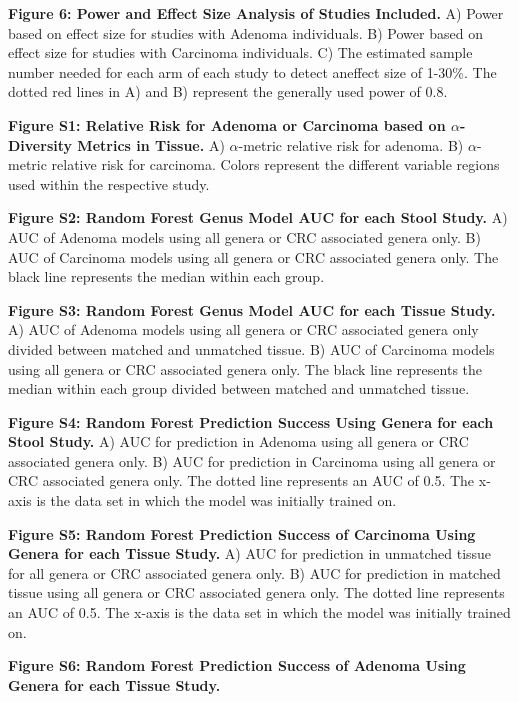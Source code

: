 \documentclass[12pt,]{article}
\begin{document}
\textbf{Figure 6: Power and Effect Size Analysis of Studies Included.}
A) Power based on effect size for studies with Adenoma individuals. B)
Power based on effect size for studies with Carcinoma individuals. C)
The estimated sample number needed for each arm of each study to detect
aneffect size of 1-30\%. The dotted red lines in A) and B) represent the
generally used power of 0.8.

\newpage

\textbf{Figure S1: Relative Risk for Adenoma or Carcinoma based on
\(\alpha\)-Diversity Metrics in Tissue.} A) \(\alpha\)-metric relative
risk for adenoma. B) \(\alpha\)-metric relative risk for carcinoma.
Colors represent the different variable regions used within the
respective study.

\textbf{Figure S2: Random Forest Genus Model AUC for each Stool Study.}
A) AUC of Adenoma models using all genera or CRC associated genera only.
B) AUC of Carcinoma models using all genera or CRC associated genera
only. The black line represents the median within each group.

\textbf{Figure S3: Random Forest Genus Model AUC for each Tissue Study.}
A) AUC of Adenoma models using all genera or CRC associated genera only
divided between matched and unmatched tissue. B) AUC of Carcinoma models
using all genera or CRC associated genera only. The black line
represents the median within each group divided between matched and
unmatched tissue.

\textbf{Figure S4: Random Forest Prediction Success Using Genera for
each Stool Study.} A) AUC for prediction in Adenoma using all genera or
CRC associated genera only. B) AUC for prediction in Carcinoma using all
genera or CRC associated genera only. The dotted line represents an AUC
of 0.5. The x-axis is the data set in which the model was initially
trained on.

\textbf{Figure S5: Random Forest Prediction Success of Carcinoma Using
Genera for each Tissue Study.} A) AUC for prediction in unmatched tissue
for all genera or CRC associated genera only. B) AUC for prediction in
matched tissue using all genera or CRC associated genera only. The
dotted line represents an AUC of 0.5. The x-axis is the data set in
which the model was initially trained on.

\textbf{Figure S6: Random Forest Prediction Success of Adenoma Using
Genera for each Tissue Study.}

\newpage
\end{document}
